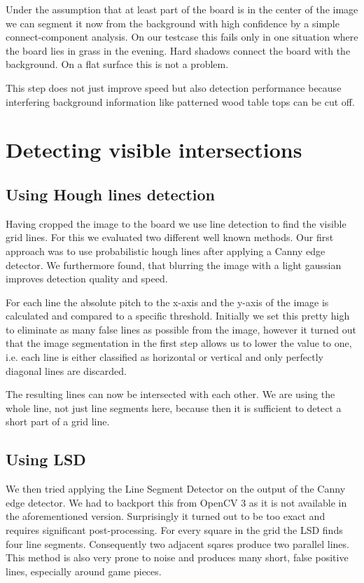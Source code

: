 	Under the assumption that at least part of the board is in the center of the image we can segment it now from the background with high confidence by a simple connect-component analysis. On our testcase this fails only in one situation where the board lies in grass in the evening. Hard shadows connect the board with the background. On a flat surface this is not a problem.

	This step does not just improve speed but also detection performance because interfering background information like patterned wood table tops can be cut off.

	\section{Detecting visible intersections}
	\subsection{Using Hough lines detection}
	\label{detector-visible-hough}
	Having cropped the image to the board we use line detection to find the visible grid lines. For this we evaluated two different well known methods. Our first approach was to use probabilistic hough lines after applying a Canny edge detector. We furthermore found, that blurring the image with a light gaussian improves detection quality and speed.

	For each line the absolute pitch to the x-axis and the y-axis of the image is calculated and compared to a specific threshold. Initially we set this pretty high to eliminate as many false lines as possible from the image, however it turned out that the image segmentation in the first step allows us to lower the value to one, i.e. each line is either classified as horizontal or vertical and only perfectly diagonal lines are discarded.

	The resulting lines can now be intersected with each other. We are using the whole line, not just line segments here, because then it is sufficient to detect a short part of a grid line.

	\subsection{Using LSD}
	\label{detector-visible-lsd}
	We then tried applying the Line Segment Detector \cite{} on the output of the Canny edge detector. We had to backport this from OpenCV 3 as it is not available in the aforementioned version. Surprisingly it turned out to be too exact and requires significant post-processing. For every square in the grid the LSD finds four line segments. Consequently two adjacent sqares produce two parallel lines. This method is also very prone to noise and produces many short, false positive lines, especially around game pieces.

